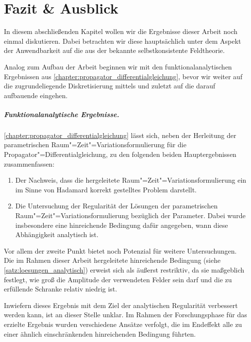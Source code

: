 \documentclass[../main.tex]{subfiles}
\begin{document}
\chapter{Fazit \& Ausblick} %
\label{chapter:ausblick}

In diesem abschließenden Kapitel wollen wir die Ergebnisse dieser Arbeit noch einmal diskutieren.
Dabei betrachten wir diese hauptsächlich unter dem Aspekt der Anwendbarkeit auf die aus der  bekannte selbstkonsistente Feldtheorie.

Analog zum Aufbau der Arbeit beginnen wir mit den funktionalanalytischen Ergebnissen aus \cref{chapter:propagator_differentialgleichung}, bevor wir weiter auf die zugrundeliegende Diskretisierung mittels  und zuletzt auf die darauf aufbauende  eingehen.

\paragraph{Funktionalanalytische Ergebnisse.} %
\label{par:funktionalanalytische_ergebnisse}

\cref{chapter:propagator_differentialgleichung} lässt sich, neben der Herleitung der parametrischen Raum"=Zeit"=Variationsformulierung für die Propagator"=Differentialgleichung, zu den folgenden beiden Hauptergebnissen zusammenfassen:

\begin{enumerate}[label={\itshape\roman*.},ref={\itshape\roman*}]
    \item
    Der Nachweis, dass die hergeleitete Raum"=Zeit"=Variationsformulierung ein im Sinne von Hadamard korrekt gestelltes Problem darstellt.
    \item
    Die Untersuchung der Regularität der Lösungen der parametrischen Raum"=Zeit"=Variationsformulierung bezüglich der Parameter.
    Dabei wurde insbesondere eine hinreichende Bedingung dafür angegeben, wann diese Abhängigkeit analytisch ist.
\end{enumerate}

Vor allem der zweite Punkt bietet noch Potenzial für weitere Untersuchungen.
Die im Rahmen dieser Arbeit hergeleitete hinreichende Bedingung (siehe \cref{satz:loesungen_analytisch}) erweist sich als äußerst restriktiv, da sie maßgeblich festlegt, wie groß die Amplitude der verwendeten Felder sein darf und die zu erfüllende Schranke relativ niedrig ist.

Inwiefern dieses Ergebnis mit dem Ziel der analytischen Regularität verbessert werden kann, ist an dieser Stelle unklar.
Im Rahmen der Forschungsphase für das erzielte Ergebnis wurden verschiedene Ansätze verfolgt, die im Endeffekt alle zu einer ähnlich einschränkenden hinreichenden Bedingung führten.
\end{document}
